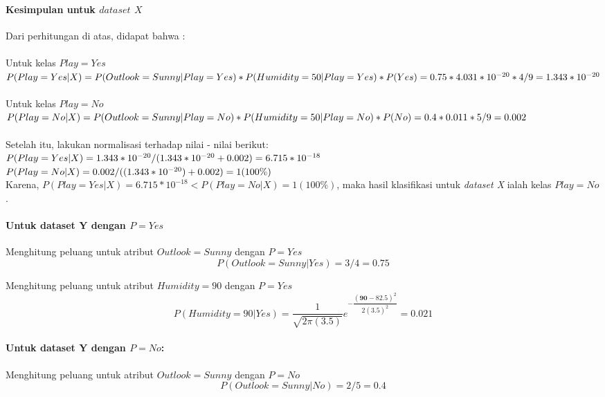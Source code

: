 	\paragraph{Kesimpulan untuk $dataset$ $X$}
	Dari perhitungan di atas, didapat bahwa : \\ \\
	Untuk kelas $Play=Yes$ \\
	$P(Play=Yes|X) \\
	= P(Outlook=Sunny|Play=Yes)*P(Humidity=50|Play=Yes)*P(Yes) \\
	= 0.75 * 4.031*10^{-20} * 4/9 \\
	= 1.343*10^{-20}$ \\ \\
	Untuk kelas $Play=No$ \\
	$P(Play=No|X) \\
	= P(Outlook=Sunny|Play=No)*P(Humidity=50|Play=No)*P(No) \\
	= 0.4 * 0.011 * 5/9 \\
	= 0.002$ \\ \\
	Setelah itu, lakukan normalisasi terhadap nilai - nilai berikut: \\
	$P(Play=Yes|X) = 1.343*10^{-20} / (1.343*10^{-20} + 0.002) \\
	= 6.715*10^{-18}$ \\
	$P(Play=No|X) = 0.002 / ((1.343*10^{-20}) + 0.002) \\
	= 1 (100\%)$ \\
	
	Karena, $P(Play=Yes|X) = 6.715*10^{-18} < P(Play=No|X) = 1 (100\%) $, maka hasil klasifikasi untuk \textit{dataset X} ialah kelas $Play=No$.
	
	\paragraph{Untuk dataset Y dengan $P=Yes$}
	Menghitung peluang untuk atribut $Outlook=Sunny$ dengan $P=Yes$
	\begin{equation}
			P(Outlook=Sunny|Yes) = 3/4 
			= 0.75
	\end{equation}
	
	Menghitung peluang untuk atribut $Humidity=90$ dengan $P=Yes$
		\begin{equation}
			P(Humidity=90|Yes) 
			= \dfrac{1}{\sqrt{2\pi(3.5)}}e^{-\dfrac{(\textbf{90}-82.5)^2}{2(3.5)^2}}
			= 0.021
		\end{equation}
	
	\paragraph{Untuk dataset Y dengan $P=No$:}
	Menghitung peluang untuk atribut $Outlook=Sunny$ dengan $P=No$
	\begin{equation}
				P(Outlook=Sunny|No)
				= 2/5 
				= 0.4
		\end{equation}
	
